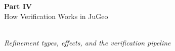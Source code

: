 
\begin{frame}
\frametitle{}
\vfill
\begin{center}
  {\Huge\color{jugeoBlue}\textbf{Part IV}}\\[12pt]
  {\LARGE\color{jugeoDark}How Verification Works in JuGeo}\\[20pt]
  \\[12pt]
  {\large\color{gray}\itshape Refinement types, effects, and the verification pipeline}
\end{center}
\vfill
\end{frame}

